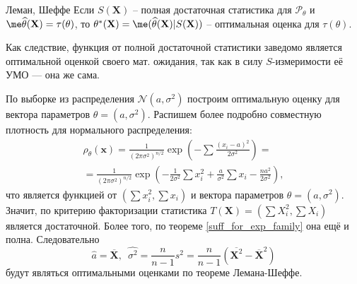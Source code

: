 \begin{theorem}[label=lehmann_scheffe]{Леман, Шеффе}{}
    Если $S(\mathbf X)$ -- полная достаточная статистика для $\mathcal P_{\theta}$ и $\me \widehat{\theta}(\mathbf X) = \tau(\theta)$, то $\theta^*(\mathbf X) = \me (\widehat{\theta}(\mathbf X) | S(\mathbf X))$ -- оптимальная оценка для $\tau(\theta)$.
\end{theorem}

Как следствие, функция от полной достаточной статистики заведомо является оптимальной оценкой своего мат. ожидания, так как в силу $S$-измеримости её УМО --- она же сама.

\begin{example}\label{suff_norm}
     По выборке из распределения $\mathcal N(a, \sigma^2)$ построим оптимальную оценку для вектора параметров $\theta = (a, \sigma^2)$. Распишем более подробно совместную плотность для нормального распределения:
    \begin{gather*}
    \rho_{\theta}(\mathbf{x}) = \frac{1}{(2\pi\sigma^2)^{n/2}}\exp\left(-\sum \frac{(x_i - a)^2}{2\sigma^2}\right) = \\
    = \frac{1}{(2\pi\sigma^2)^{n/2}}\exp\left(-\frac1{2\sigma^2}\sum x_i^2 + \frac{a}{\sigma^2}\sum x_i - \frac{na^2}{2\sigma^2}\right),
    \end{gather*}
    что является функцией от $\left(\sum x_i^2, \sum x_i\right)$ и вектора параметров $\theta = (a, \sigma^2)$. Значит, по критерию факторизации статистика $T(\mathbf X)=\left(\sum X_i^2, \sum X_i\right)$ является достаточной. Более того, по теореме \ref{suff_for_exp_family} она ещё и полна. Следовательно
    \[
    \widehat{a} = \overline{\mathbf X},\,\,\,\widehat{\sigma^2} = \frac{n}{n-1}s^2 = \frac{n}{n-1}(\overline{\mathbf X^2} - \overline{\mathbf X}^2)
    \]
    будут являться оптимальными оценками по теореме Лемана-Шеффе.
\end{example}


